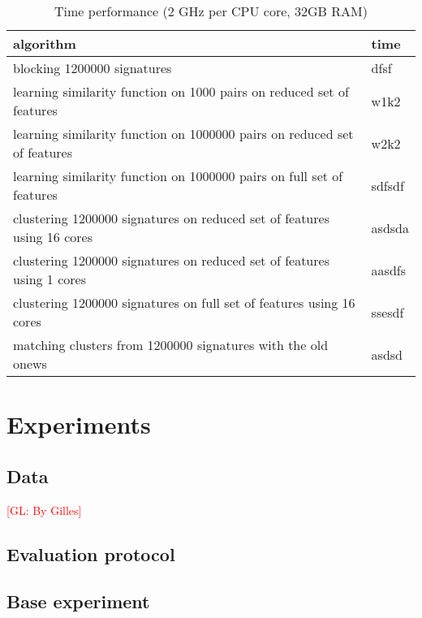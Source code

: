 \documentclass{article}
\newcommand{\glnote}[1]{\textcolor{red}{[GL: #1]}}
\begin{document}
\FloatBarrier
\begin{table}[H]
\caption{Time performance (2 GHz per CPU core, 32GB RAM)}
\centering
\begin{tabular}{|l|l|}
  \hline
  \textbf{algorithm} & \textbf{time}\\
  \hline
  blocking 1200000 signatures & dfsf \\
  \hline
  learning similarity function on 1000 pairs on reduced set of features & w1k2\\
  \hline
  learning similarity function on 1000000 pairs on reduced set of features & w2k2 \\
  \hline
  learning similarity function on 1000000 pairs on full set of features & sdfsdf \\
  \hline
  clustering 1200000 signatures on reduced set of features using 16 cores & asdsda \\
  \hline
  clustering 1200000 signatures on reduced set of features using 1 cores & aasdfs \\
  \hline
  clustering 1200000 signatures on full set of features using 16 cores & ssesdf \\
  \hline
  matching clusters from 1200000 signatures with the old onews & asdsd \\
  \hline
\end{tabular}
\end{table}




\section{Experiments}
\label{experiments}

\subsection{Data}

\glnote{By Gilles}


\subsection{Evaluation protocol}


\subsection{Base experiment}
\end{document}
